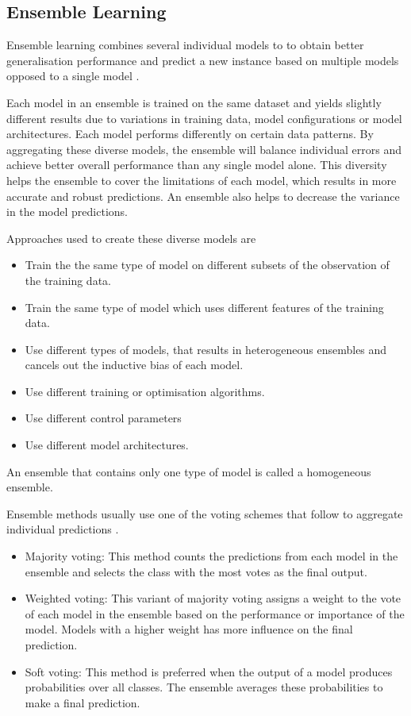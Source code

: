 \documentclass[10pt, conference]{IEEEtran}
\begin{document}
\subsection{Ensemble Learning}

Ensemble learning combines several individual models to to obtain better generalisation performance and predict a new instance
based on multiple models opposed to a single model \cite{Ensemble_ref}.

Each model in an ensemble is trained on the same dataset and yields slightly different results due to variations
in training data, model configurations or model architectures. Each model performs differently on certain data
patterns. By aggregating these diverse models, the ensemble will balance individual errors and
achieve better overall performance than any single model alone. This diversity helps the ensemble to cover the
limitations of each model, which results in more accurate and robust predictions. An ensemble also helps to
decrease the variance in the model predictions.

Approaches used to create these diverse models are
\begin{itemize}
    \item Train the the same type of model on different subsets of the observation of the training data.
    \item Train the same type of model which uses different features of the training data.
    \item Use different types of models, that results in heterogeneous ensembles and cancels out the inductive bias of each model.
    \item Use different training or optimisation algorithms.
    \item Use different control parameters
    \item Use different model architectures.
\end{itemize}
An ensemble that contains only one type of model is called a homogeneous ensemble.

Ensemble methods usually use one of the voting schemes that follow to aggregate individual
predictions \cite{Voting_ref}.
\begin{itemize}
    \item Majority voting: This method counts the predictions from each model in the ensemble and selects the class with the most votes as the final output.
    \item Weighted voting: This variant of majority voting assigns a weight to the vote of each model in the ensemble based on the performance or importance of the model.
            Models with a higher weight has more influence on the final prediction.
    \item Soft voting: This method is preferred when the output of a model produces probabilities over all classes. The ensemble averages these probabilities to make a final prediction. 
\end{itemize}
\end{document}
